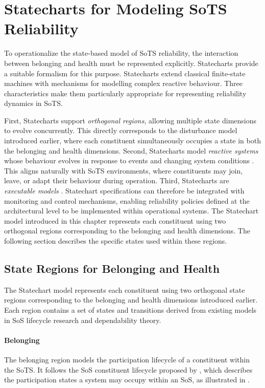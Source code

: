 \section{Statecharts for Modeling SoTS Reliability}
\label{sec:statecharts-reliability}

To operationalize the state-based model of SoTS reliability, the interaction between belonging and health must be represented explicitly. Statecharts \cite{harel1987statecharts} provide a suitable formalism for this purpose. Statecharts extend classical finite-state machines with mechanisms for modelling complex reactive behaviour. Three characteristics make them particularly appropriate for representing reliability dynamics in SoTS.

First, Statecharts support \emph{orthogonal regions}, allowing multiple state dimensions to evolve concurrently. This directly corresponds to the disturbance model introduced earlier, where each constituent simultaneously occupies a state in both the belonging and health dimensions. Second, Statecharts model \emph{reactive systems} whose behaviour evolves in response to events and changing system conditions \cite{harel1998modeling}. This aligns naturally with SoTS environments, where constituents may join, leave, or adapt their behaviour during operation. Third, Statecharts are \emph{executable models} \cite{harel1996executable}. Statechart specifications can therefore be integrated with monitoring and control mechanisms, enabling reliability policies defined at the architectural level to be implemented within operational systems. The Statechart model introduced in this chapter represents each constituent using two orthogonal regions corresponding to the belonging and health dimensions. The following section describes the specific states used within these regions.


\subsection{State Regions for Belonging and Health}
\label{sec:constituent-state-space}

The Statechart model represents each constituent using two orthogonal state regions corresponding to the belonging and health dimensions introduced earlier. Each region contains a set of states and transitions derived from existing models in SoS lifecycle research and dependability theory.

\paragraph{Belonging}
The belonging region models the participation lifecycle of a constituent within the SoTS. It follows the SoS constituent lifecycle proposed by \citet{axelsson2019refined}, which describes the participation states a system may occupy within an SoS, as illustrated in .

